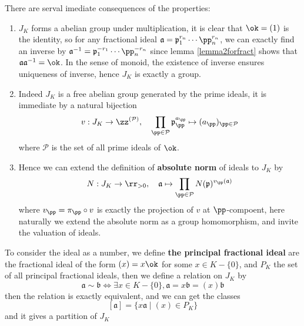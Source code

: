 \begin{remark}
    There are serval imediate consequences of the properties:
    \begin{enumerate}
        \item \(J_K\) forms a abelian group under multiplication, it is clear that \(\ok=(1)\) is the identity, so for any fractional ideal \(\mathfrak{a} = \mathfrak{p}_1^{r_n} \cdots \pp_n^{r_n}\), we can exactly find an inverse by \(\mathfrak{a}^{-1} = \mathfrak{p}_1^{-r_1} \cdots \pp_n^{-r_n}\) since lemma \ref{lemma2forfract} shows that \(\mathfrak{a}\mathfrak{a}^{-1} = \ok\). In the sense of monoid, the existence of inverse ensures uniqueness of inverse, hence \(J_K\) is exactly a group.
        \item Indeed \(J_K\) is a free abelian group generated by the prime ideals, it is immediate by a natural bijection
        \[v:  J_K \to \zz^{(\mathcal{P})}  , \quad \prod_{\pp \in \mathcal{P}} \mathfrak{p}_\pp^{a_\pp} \mapsto  (a_{\pp})_{\pp \in \mathcal{P}} \]
        where \(\mathcal{P}\) is the set of all prime ideals of \(\ok\).
        \item Hence we can extend the definition of \textbf{absolute norm} of ideals to \(J_K\) by
        \[N: J_K \to \rr_{>0}, \quad \mathfrak{a} \mapsto \prod_{\pp \in \mathcal{P}} N(\mathfrak{p})^{v_{\pp}(\mathfrak{a})}\]
        where \(v_{\pp} = \pi_{\pp} \circ v\) is exactly the projection of \(v\) at \(\pp\)-compoent, here naturally we extend the absolute norm as a group homomorphism, and invite the valuation of ideals.
    \end{enumerate}
\end{remark}


     To consider the ideal as a number, we define \textbf{the principal fractional ideal} are the fractional ideal of the form \((x) = x \ok\) for some \(x \in K-\{0\}\), and \(P_K\) the set of all principal fractional ideals, then we define a relation on \(J_K\) by
        \[\mathfrak{a} \sim \mathfrak{b} \iff \exists x \in K-\{0\}, \mathfrak{a} = x\mathfrak{b} = (x)\mathfrak{b}\]
        then the relation is exactly equivalent, and we can get the classes
        \[[\mathfrak{a}] = \{x\mathfrak{a} \mid (x) \in P_K\}\]
        and it gives a partition of \(J_K\) 

